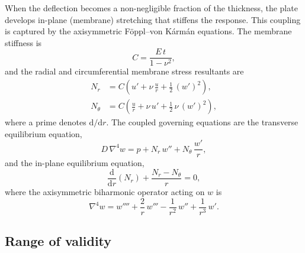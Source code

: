 \documentclass[11pt]{article}
\begin{document}
When the deflection becomes a non-negligible fraction of the thickness, the plate
develops in-plane (membrane) stretching that stiffens the response. This coupling
is captured by the axisymmetric F\"oppl--von K\'arm\'an equations. The membrane
stiffness is
%
\begin{equation}
  C = \frac{E\,t}{1-\nu^{2}},
\end{equation}
%
and the radial and circumferential membrane stress resultants are
%
\begin{align}
  N_{r} &= C\left( u' + \nu\,\frac{u}{r} + \tfrac{1}{2}\,(w')^{2} \right), \\
  N_{\theta} &= C\left( \frac{u}{r} + \nu\,u' + \tfrac{1}{2}\,\nu\,(w')^{2} \right),
\end{align}
%
where a prime denotes $\mathrm{d}/\mathrm{d}r$. The coupled governing equations are
the transverse equilibrium equation,
%
\begin{equation}
  D\,\nabla^{4} w = p + N_{r}\,w'' + N_{\theta}\,\frac{w'}{r},
  \label{eq:transverse}
\end{equation}
%
and the in-plane equilibrium equation,
%
\begin{equation}
  \frac{\mathrm{d}}{\mathrm{d}r}\!\left( N_{r} \right) + \frac{N_{r}-N_{\theta}}{r} = 0,
  \label{eq:inplane}
\end{equation}
%
where the axisymmetric biharmonic operator acting on $w$ is
%
\begin{equation}
  \nabla^{4} w
  = w'''' + \frac{2}{r}\,w''' - \frac{1}{r^{2}}\,w'' + \frac{1}{r^{3}}\,w'.
\end{equation}

\subsection{Range of validity}
\label{sec:validity}
\end{document}
